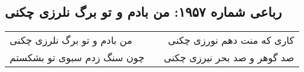 \begin{center}
\section*{رباعی شماره ۱۹۵۷: من بادم و تو برگ نلرزی چکنی}
\label{sec:1957}
\begin{longtable}{l p{0.5cm} r}
من بادم و تو برگ نلرزی چکنی
&&
کاری که منت دهم نورزی چکنی
\\
چون سنگ زدم سبوی تو بشکستم
&&
صد گوهر و صد بحر نیرزی چکنی
\\
\end{longtable}
\end{center}
